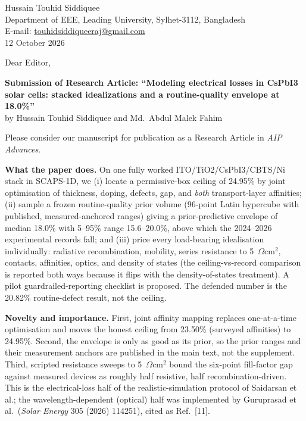 \documentclass[11pt,a4paper]{article}
\begin{document}
\begin{flushright}
Hussain Touhid Siddiquee\\
Department of EEE, Leading University, Sylhet-3112, Bangladesh\\
E-mail: \url{touhidsiddiqueeraj@gmail.com}\\
12 October 2026
\end{flushright}

\vspace{1em}
\noindent Dear Editor,

\vspace{1em}
\noindent\textbf{Submission of Research Article: ``Modeling electrical losses in CsPbI3 solar cells: stacked idealizations and a routine-quality envelope at 18.0\%''}\\
by Hussain Touhid Siddiquee and Md.\ Abdul Malek Fahim

\vspace{1em}
Please consider our manuscript for publication as a Research Article in \textit{AIP Advances}.

\textbf{What the paper does.} On one fully worked ITO/TiO2/CsPbI3/CBTS/Ni stack in SCAPS-1D, we (i) locate a permissive-box ceiling of 24.95\% by joint optimisation of thickness, doping, defects, gap, and \textit{both} transport-layer affinities; (ii) sample a frozen routine-quality prior volume (96-point Latin hypercube with published, measured-anchored ranges) giving a prior-predictive envelope of median 18.0\% with 5--95\% range 15.6--20.0\%, above which the 2024--2026 experimental records fall; and (iii) price every load-bearing idealisation individually: radiative recombination, mobility, series resistance to 5~$\Omega$cm$^2$, contacts, affinities, optics, and density of states (the ceiling-vs-record comparison is reported both ways because it flips with the density-of-states treatment). A pilot guardrailed-reporting checklist is proposed. The defended number is the 20.82\% routine-defect result, not the ceiling.

\textbf{Novelty and importance.} First, joint affinity mapping replaces one-at-a-time optimisation and moves the honest ceiling from 23.50\% (surveyed affinities) to 24.95\%. Second, the envelope is only as good as its prior, so the prior ranges and their measurement anchors are published in the main text, not the supplement. Third, scripted resistance sweeps to 5~$\Omega$cm$^2$ bound the six-point fill-factor gap against measured devices as roughly half resistive, half recombination-driven. This is the electrical-loss half of the realistic-simulation protocol of Saidarsan et al.; the wavelength-dependent (optical) half was implemented by Guruprasad et al.\ (\textit{Solar Energy} 305 (2026) 114251), cited as Ref.~[11].
\end{document}
